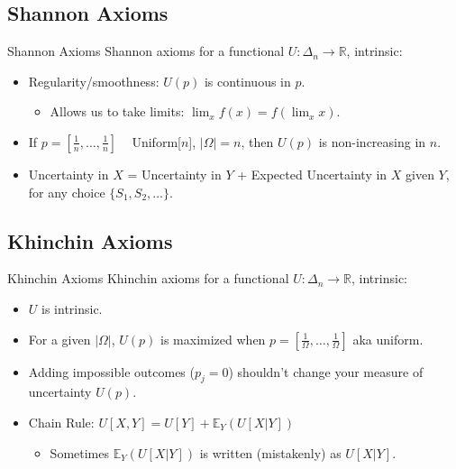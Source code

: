 \subsection{Shannon Axioms}

\begin{defn}{Shannon Axioms}
Shannon axioms for a functional \( U: \Delta_n \rightarrow \mathbb{R} \), intrinsic:
\begin{itemize}
    \item Regularity/smoothness: \( U(p) \) is continuous in \( p \).
    \begin{itemize}
        \item Allows us to take limits: \( \lim_{x} f(x) = f(\lim_{x} x) \).
    \end{itemize}
    \item If \( p = [\frac{1}{n}, \ldots, \frac{1}{n}] \) ~ Uniform[\( n \)], \( |\Omega|=n \), then \( U(p) \) is non-increasing in \( n \).
    \item Uncertainty in \( X \) = Uncertainty in \( Y \) + Expected Uncertainty in \( X \) given \( Y \), for any choice \( \{S_1, S_2, \ldots\} \).
\end{itemize}
\end{defn}

\subsection{Khinchin Axioms}

\begin{defn}{Khinchin Axioms}
Khinchin axioms for a functional \( U: \Delta_n \rightarrow \mathbb{R} \), intrinsic:
\begin{itemize}
    \item \( U \) is intrinsic.
    \item For a given \( |\Omega| \), \( U(p) \) is maximized when \( p = [\frac{1}{\Omega}, \ldots, \frac{1}{\Omega}] \) aka uniform.
    \item Adding impossible outcomes (\( p_j = 0 \)) shouldn’t change your measure of uncertainty \( U(p) \).
    \item Chain Rule: \( U[X, Y] = U[Y] + \mathbb{E}_Y(U[X|Y]) \)
    \begin{itemize}
        \item Sometimes \( \mathbb{E}_Y(U[X|Y]) \) is written (mistakenly) as \( U[X|Y] \).
    \end{itemize}
\end{itemize}
\end{defn}

